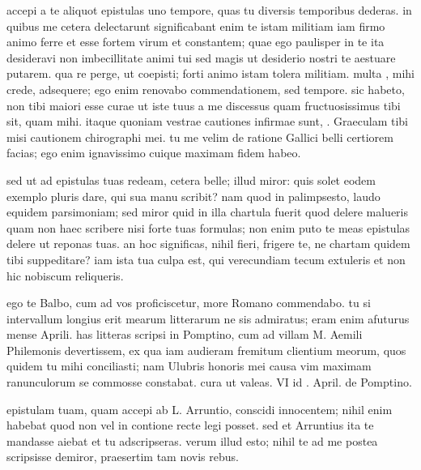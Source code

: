 


 accepi a te aliquot epistulas uno tempore, quas tu diversis temporibus dederas. in quibus me cetera delectarunt significabant enim te istam militiam iam firmo animo ferre et esse fortem virum et constantem; quae ego paulisper in te ita desideravi non imbecillitate animi tui sed magis ut desiderio nostri te aestuare putarem. qua re perge, ut coepisti; forti animo istam tolera militiam. multa , mihi crede, adsequere; ego enim renovabo commendationem, sed tempore. sic habeto, non tibi maiori esse curae ut iste tuus a me discessus quam fructuosissimus tibi sit, quam mihi. itaque quoniam vestrae cautiones infirmae sunt, . Graeculam tibi misi cautionem chirographi mei. tu me velim de ratione Gallici belli certiorem facias; ego enim ignavissimo cuique maximam fidem habeo.

 sed ut ad epistulas tuas redeam, cetera belle; illud miror: quis solet eodem exemplo pluris dare, qui sua manu scribit? nam quod in palimpsesto, laudo equidem parsimoniam; sed miror quid in illa chartula fuerit quod delere malueris quam non haec scribere nisi forte tuas formulas; non enim puto te meas epistulas delere ut reponas tuas. an hoc significas, nihil fieri, frigere te, ne chartam quidem tibi suppeditare? iam ista tua culpa est, qui verecundiam tecum extuleris et non hic nobiscum reliqueris.

 ego te Balbo, cum ad vos proficiscetur, more Romano commendabo. tu si intervallum longius erit mearum litterarum ne sis admiratus; eram enim afuturus mense Aprili. has litteras scripsi in Pomptino, cum ad villam M. Aemili Philemonis devertissem, ex qua iam audieram fremitum clientium meorum, quos quidem tu mihi conciliasti; nam Ulubris honoris mei causa vim maximam ranunculorum se commosse constabat. cura ut valeas. VI id . April. de Pomptino.

 epistulam tuam, quam accepi ab L. Arruntio, conscidi innocentem; nihil enim habebat quod non vel in contione recte legi posset. sed et Arruntius ita te mandasse aiebat et tu adscripseras. verum illud esto; nihil te ad me postea scripsisse demiror, praesertim tam novis rebus.
